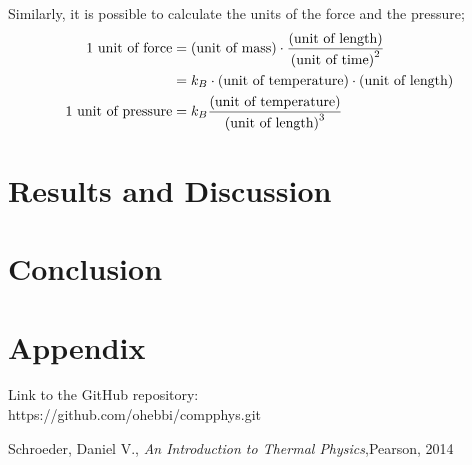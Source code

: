 \documentclass{article}
\begin{document}
Similarly, it is possible to calculate the units of the force and the pressure;
\begin{align}
	\textnormal{1 unit of force} &= \textnormal{(unit of mass)}\cdot\frac{\textnormal{(unit of length)}}{\textnormal{(unit of time)}^2}\\
	 &= k_B \cdot \textnormal{(unit of temperature)}\cdot\textnormal{(unit of length)}\\
	\textnormal{1 unit of pressure} &=k_B \frac{\textnormal{(unit of temperature)}}{\textnormal{(unit of length)}^3}
\end{align}


\section{Results and Discussion}





\section{Conclusion}


\section{Appendix}
Link to the GitHub repository:\\

https://github.com/ohebbi/compphys.git

\begin{thebibliography}{}
Schroeder, Daniel V., \textit{An Introduction to Thermal Physics},Pearson, 2014\\
\end{thebibliography}
\end{document}
